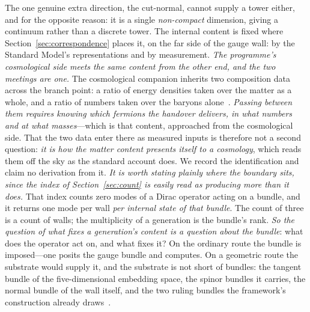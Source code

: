 \documentclass[11pt]{article}
\begin{document}
The one genuine extra direction, the cut-normal, cannot supply a tower either, and for the opposite reason: it is a single \emph{non-compact} dimension, giving a continuum rather than a discrete tower. The internal
content is fixed where Section~\ref{sec:correspondence} places it, on the far side of the gauge wall: by the
Standard Model's representations and by measurement. \emph{The programme's cosmological
side meets the same content from the other end, and the two meetings are one.} The
cosmological companion inherits two composition data across the branch point: a ratio of energy densities taken
over the matter as a whole, and a ratio of numbers taken over the baryons
alone~\cite{JanzenCRcosmology, JanzenCosmogenesis}. \emph{Passing between them requires knowing which fermions
the handover delivers, in what numbers and at what masses}---which is that content, approached from the
cosmological side. That the two data enter there as measured inputs is therefore not a second question:
\emph{it is how the matter content presents itself to a cosmology}, which reads them off the sky as the standard
account does. We record the identification and claim no derivation from it. \emph{It is worth stating plainly
where the boundary sits, since the index of Section~\ref{sec:count} is easily
read as producing more than it does.} That index counts zero modes of a Dirac operator acting on a bundle, and
it returns one mode per wall \emph{per internal state of that bundle}. The count of three is a count of walls;
the multiplicity of a generation is the bundle's rank. \emph{So the question of what fixes a generation's content
is a question about the bundle}: what does the operator act on, and what fixes it? On the ordinary route the
bundle is imposed---one posits the gauge bundle and computes. On a geometric route the substrate would supply
it, and the substrate is not short of bundles: the tangent bundle of the five-dimensional embedding space, the
spinor bundles it carries, the normal bundle of the wall itself, and the two ruling bundles the framework's
construction already draws~\cite{JanzenCRframework}.
\end{document}
